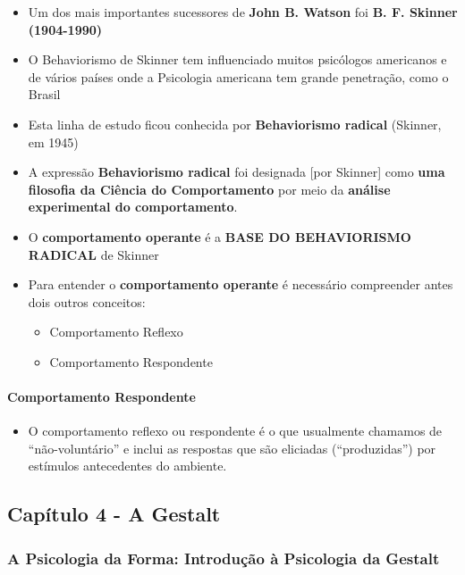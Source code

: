 \documentclass[
]{book}
\providecommand{\tightlist}{%
  \setlength{\itemsep}{0pt}\setlength{\parskip}{0pt}}
\begin{document}
\begin{itemize}
\tightlist
\item
  Um dos mais importantes sucessores de \textbf{John B. Watson} foi \textbf{B. F. Skinner (1904-1990)}
\item
  O Behaviorismo de Skinner tem influenciado muitos psicólogos americanos e de vários países onde a Psicologia americana tem grande penetração, como o Brasil
\item
  Esta linha de estudo ficou conhecida por \textbf{Behaviorismo radical} (Skinner, em 1945)
\item
  A expressão \textbf{Behaviorismo radical} foi designada {[}por Skinner{]} como \textbf{uma filosofia da Ciência do Comportamento} por meio da \textbf{análise experimental do comportamento}.
\item
  O \textbf{comportamento operante} é a \textbf{BASE DO BEHAVIORISMO RADICAL} de Skinner
\item
  Para entender o \textbf{comportamento operante} é necessário compreender antes dois outros conceitos:

  \begin{itemize}
  \tightlist
  \item
    Comportamento Reflexo
  \item
    Comportamento Respondente
  \end{itemize}
\end{itemize}

\hypertarget{comportamento-respondente}{%
\paragraph{Comportamento Respondente}\label{comportamento-respondente}}

\begin{itemize}
\tightlist
\item
  O comportamento reflexo ou respondente é o que usualmente chamamos de ``não-voluntário'' e inclui as respostas que são eliciadas (``produzidas'') por estímulos antecedentes do ambiente.
\end{itemize}

\hypertarget{capuxedtulo-4---a-gestalt}{%
\subsection{Capítulo 4 - A Gestalt}\label{capuxedtulo-4---a-gestalt}}

\hypertarget{a-psicologia-da-forma-introduuxe7uxe3o-uxe0-psicologia-da-gestalt}{%
\subsubsection{A Psicologia da Forma: Introdução à Psicologia da Gestalt}\label{a-psicologia-da-forma-introduuxe7uxe3o-uxe0-psicologia-da-gestalt}}
\end{document}
